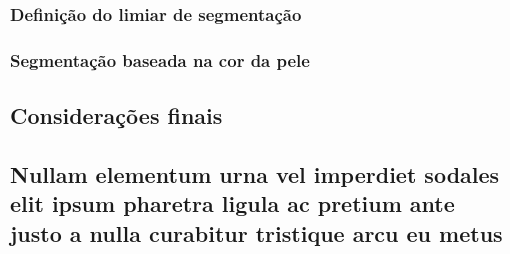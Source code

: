 \documentclass[
	article,			%
	11pt,				%
	oneside,			%
	a4paper,			%
	english,			%
	brazil,				%
	sumario=tradicional
	]{abntex2}
\begin{document}
\subsection{Definição do limiar de segmentação}

\subsection{Segmentação baseada na cor da pele}
% 

\section*{Considerações finais}

\lipsum[1]

\begin{citacao}
\lipsum[2]
\end{citacao}

\lipsum[3]



%
%


\begin{apendicesenv}

\chapter{Nullam elementum urna vel imperdiet sodales elit ipsum pharetra ligula
ac pretium ante justo a nulla curabitur tristique arcu eu metus}
\lipsum[55-57]

\end{apendicesenv}

\begin{anexosenv}

\chapter{}

\lipsum[31]

\end{anexosenv}
\end{document}
